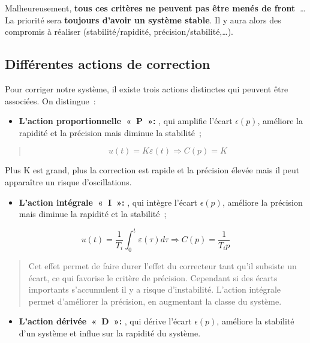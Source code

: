 Malheureusement, \textbf{tous ces critères ne peuvent pas être menés de front~}\ldots{} La priorité sera \textbf{toujours d'avoir un système stable}. Il y aura alors des compromis à réaliser (stabilité/rapidité, précision/stabilité,\ldots).

\hypertarget{diffuxe9rentes-actions-de-correction}{%
\subsection{Différentes actions de correction}\label{diffuxe9rentes-actions-de-correction}}

\TLTroisActionsCorrection


Pour corriger notre système, il existe trois actions distinctes qui peuvent être associées. On distingue~:

\begin{itemize}
\item
  \textbf{L'action proportionnelle~«~P~»:} , qui amplifie l'écart \(\epsilon(p)\), améliore la rapidité et la précision mais diminue la stabilité~;
\end{itemize}

\begin{quote}
\[u(t) = K\varepsilon(t) \Rightarrow \boxed{C(p) = K}\]
\end{quote}

Plus K est grand, plus la correction est rapide et la précision élevée mais il peut apparaître un risque d'oscillations.

\begin{itemize}
\item
  \textbf{L'action intégrale~«~I~»:} , qui intègre l'écart \(\epsilon(p)\), améliore la précision mais diminue la rapidité et la stabilité~;
\end{itemize}

\[u(t) = \frac{1}{T_{i}}\int_{0}^{t}{\varepsilon(\tau)d\tau} \Rightarrow \boxed{C(p) = \frac{1}{T_{i}p}}\]

\begin{quote}
Cet effet permet de faire durer l'effet du correcteur tant qu'il subsiste un écart, ce qui favorise le critère de précision. Cependant si des écarts importants s'accumulent il y a risque d'instabilité. L'action intégrale permet d'améliorer la précision, en augmentant la classe du système.
\end{quote}

\begin{itemize}
\item
  \textbf{L'action dérivée~«~D~»:} , qui dérive l'écart \(\epsilon(p)\), améliore la stabilité d'un système et influe sur la rapidité du système.
\end{itemize}

